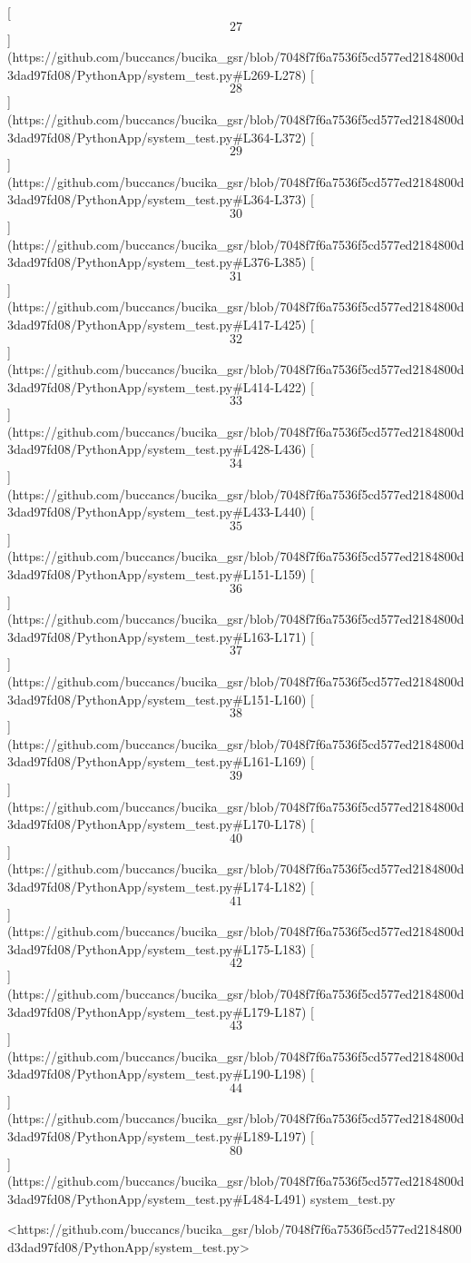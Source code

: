\documentclass[12pt,a4paper]{article}
\begin{document}
{[\[27\]](https://github.com/buccancs/bucika_gsr/blob/7048f7f6a7536f5cd577ed2184800d3dad97fd08/PythonApp/system_test.py#L269-L278)
[\[28\]](https://github.com/buccancs/bucika_gsr/blob/7048f7f6a7536f5cd577ed2184800d3dad97fd08/PythonApp/system_test.py#L364-L372)
[\[29\]](https://github.com/buccancs/bucika_gsr/blob/7048f7f6a7536f5cd577ed2184800d3dad97fd08/PythonApp/system_test.py#L364-L373)
[\[30\]](https://github.com/buccancs/bucika_gsr/blob/7048f7f6a7536f5cd577ed2184800d3dad97fd08/PythonApp/system_test.py#L376-L385)
[\[31\]](https://github.com/buccancs/bucika_gsr/blob/7048f7f6a7536f5cd577ed2184800d3dad97fd08/PythonApp/system_test.py#L417-L425)
[\[32\]](https://github.com/buccancs/bucika_gsr/blob/7048f7f6a7536f5cd577ed2184800d3dad97fd08/PythonApp/system_test.py#L414-L422)
[\[33\]](https://github.com/buccancs/bucika_gsr/blob/7048f7f6a7536f5cd577ed2184800d3dad97fd08/PythonApp/system_test.py#L428-L436)
[\[34\]](https://github.com/buccancs/bucika_gsr/blob/7048f7f6a7536f5cd577ed2184800d3dad97fd08/PythonApp/system_test.py#L433-L440)
[\[35\]](https://github.com/buccancs/bucika_gsr/blob/7048f7f6a7536f5cd577ed2184800d3dad97fd08/PythonApp/system_test.py#L151-L159)
[\[36\]](https://github.com/buccancs/bucika_gsr/blob/7048f7f6a7536f5cd577ed2184800d3dad97fd08/PythonApp/system_test.py#L163-L171)
[\[37\]](https://github.com/buccancs/bucika_gsr/blob/7048f7f6a7536f5cd577ed2184800d3dad97fd08/PythonApp/system_test.py#L151-L160)
[\[38\]](https://github.com/buccancs/bucika_gsr/blob/7048f7f6a7536f5cd577ed2184800d3dad97fd08/PythonApp/system_test.py#L161-L169)
[\[39\]](https://github.com/buccancs/bucika_gsr/blob/7048f7f6a7536f5cd577ed2184800d3dad97fd08/PythonApp/system_test.py#L170-L178)
[\[40\]](https://github.com/buccancs/bucika_gsr/blob/7048f7f6a7536f5cd577ed2184800d3dad97fd08/PythonApp/system_test.py#L174-L182)
[\[41\]](https://github.com/buccancs/bucika_gsr/blob/7048f7f6a7536f5cd577ed2184800d3dad97fd08/PythonApp/system_test.py#L175-L183)
[\[42\]](https://github.com/buccancs/bucika_gsr/blob/7048f7f6a7536f5cd577ed2184800d3dad97fd08/PythonApp/system_test.py#L179-L187)
[\[43\]](https://github.com/buccancs/bucika_gsr/blob/7048f7f6a7536f5cd577ed2184800d3dad97fd08/PythonApp/system_test.py#L190-L198)
[\[44\]](https://github.com/buccancs/bucika_gsr/blob/7048f7f6a7536f5cd577ed2184800d3dad97fd08/PythonApp/system_test.py#L189-L197)
[\[80\]](https://github.com/buccancs/bucika_gsr/blob/7048f7f6a7536f5cd577ed2184800d3dad97fd08/PythonApp/system_test.py#L484-L491)
system_test.py

<https://github.com/buccancs/bucika_gsr/blob/7048f7f6a7536f5cd577ed2184800d3dad97fd08/PythonApp/system_test.py>

}
\end{document}
